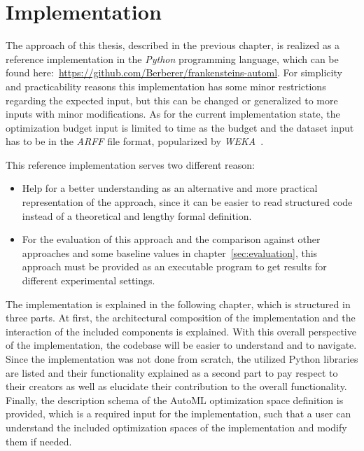 %
\chapter{Implementation}
\label{sec:implementation}
The approach of this thesis, described in the previous chapter, is realized as a reference implementation in the \textit{Python} programming language, which can be found here:~\url{https://github.com/Berberer/frankensteins-automl}.
For simplicity and practicability reasons this implementation has some minor restrictions regarding the expected input, but this can be changed or generalized to more inputs with minor modifications.
As for the current implementation state, the optimization budget input is limited to time as the budget and the dataset input has to be in the \textit{ARFF} file format, popularized by \textit{WEKA}~\cite{Witten-Weka}.

This reference implementation serves two different reason:
\begin{itemize}
	\item Help for a better understanding as an alternative and more practical representation of the approach, since it can be easier to read structured code instead of a theoretical and lengthy formal definition.
	\item For the evaluation of this approach and the comparison against other approaches and some baseline values in chapter~\ref{sec:evaluation}, this approach must be provided as an executable program to get results for different experimental settings.
\end{itemize}

The implementation is explained in the following chapter, which is structured in three parts.
At first, the architectural composition of the implementation and the interaction of the included components is explained.
With this overall perspective of the implementation, the codebase will be easier to understand and to navigate.
Since the implementation was not done from scratch, the utilized Python libraries are listed and their functionality explained as a second part to pay respect to their creators as well as elucidate their contribution to the overall functionality.
Finally, the description schema of the AutoML optimization space definition is provided, which is a required input for the implementation, such that a user can understand the included optimization spaces of the implementation and modify them if needed.

